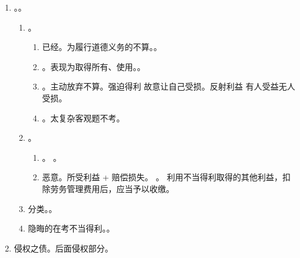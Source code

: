 \begin{enumerate}
\begin{enumerate}
\begin{enumerate}
\begin{enumerate}
                        \end{enumerate}
                  \item 3 个义务。方法有利，不得擅自中断；及时通知、等待指示、及时转交；报告。。
                \end{enumerate}
          \item {}。。
                \begin{enumerate}
                  \item {}。
                        \begin{enumerate}
                          \item 已经。为履行道德义务的不算。。
                          \item {}。表现为取得所有、使用。。
                          \item {}。主动放弃不算。\yi 强迫得利 \yjt 故意让自己受损。\er 反射利益 \yjt 有人受益无人受损。
                          \item {}。太复杂客观题不考。
                        \end{enumerate}
                  \item {}。
                        \begin{enumerate}
                          \item {}。
                                。
                          \item 恶意。所受利益 + 赔偿损失。
                                。
                                利用不当得利取得的其他利益，扣除劳务管理费用后，应当予以收缴。
                        \end{enumerate}
                  \item 分类。。
                  \item 隐晦的在考不当得利。。
                \end{enumerate}
          \item 侵权之债。后面侵权部分。
        \end{enumerate}
\end{enumerate}
